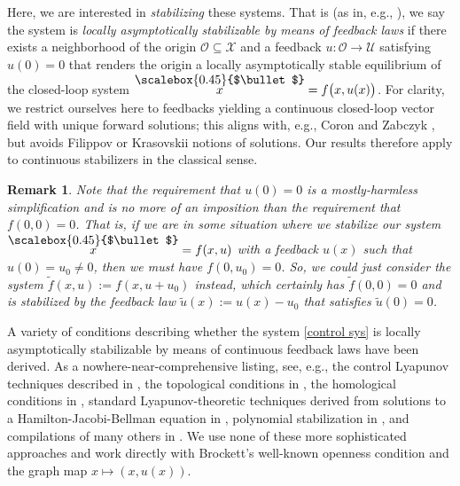 \documentclass[pdflatex,sn-mathphys-num]{sn-jnl}%
\renewcommand{\dot}[1]
    {
    \overset{\raisebox{0ex}{\scalebox{0.45}{$\bullet$}}}{#1}
    }
\theoremstyle{thmstyleone}%
\theoremstyle{thmstyletwo}%
\newtheorem{remark}{Remark}%
\theoremstyle{thmstylethree}%
\begin{document}
    Here, we are interested in {\it stabilizing} these systems. That is (as in, e.g., \cite[Definition 10.11]{coron1}), we say the system is \textit{locally asymptotically stabilizable by means of feedback laws} if there exists a neighborhood of the origin $\mathcal{O}\subseteq \mathcal{X}$ and a feedback $u  \colon  \mathcal{O} \rightarrow \mathcal{U}$ satisfying $u(0)=0$ that renders the origin a locally asymptotically stable equilibrium \cite[Definition 2.1]{byrnes} of the closed-loop system $\dot{x}=f\big (x,u(x) \big )$.  For clarity, we restrict ourselves here to feedbacks yielding a continuous closed-loop vector field with unique forward solutions; this aligns with, e.g.,  Coron and Zabczyk \cite{coron2,zab}, but avoids Filippov or Krasovskii notions of solutions. Our results therefore apply to continuous stabilizers in the classical sense. 

    
    \begin{remark}
        Note that the requirement that $u(0)=0$ is a mostly-harmless simplification and is no more of an imposition than the requirement that $f(0,0)=0$.  That is, if we are in some situation where we stabilize our system $\dot{x}=f(x,u)$ with a feedback $u(x)$ such that $u(0)=u_0\neq 0$, then we must have $f(0,u_0) = 0$.  So, we could just consider the system $\tilde{f}(x,u) := f(x,u+u_0)$ instead, which certainly has $\tilde{f}(0,0) = 0$ and is stabilized by the feedback law $\tilde{u}(x) := u(x)-u_0$ that satisfies $\tilde{u}(0)=0$.
    \end{remark}
    
    
    A variety of conditions describing whether the system \eqref{control sys} is locally asymptotically stabilizable by means of continuous feedback laws have been derived. As a nowhere-near-comprehensive listing, see, e.g., the control Lyapunov techniques described in \cite{artstein,Lafferriere,braun,goebel}, the topological conditions in \cite{brockett,byrnes,coron2,coron1, gupta2017linear, christopherson2019, christopherson2022continuous}, the homological conditions in \cite{coron2}, standard Lyapunov-theoretic techniques derived from solutions to a Hamilton-Jacobi-Bellman equation in \cite{hermes}, polynomial stabilization in \cite{jammazi}, and compilations of many others in \cite{coron1, sontag1,sontag2,onishchenko1, onishchenko2}.  We use none of these more sophisticated approaches and work directly with Brockett's well-known openness condition and the graph map $x\mapsto (x,u(x))$.
    
\end{document}
